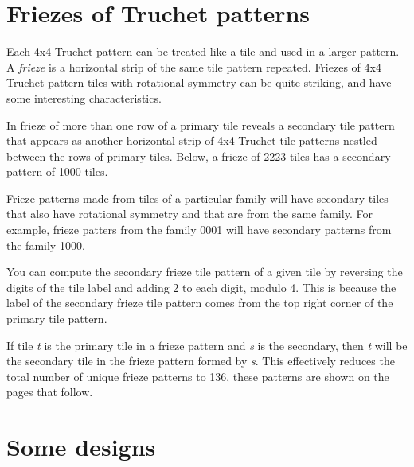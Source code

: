 \documentclass{tufte-book}
\begin{document}

%
% 
% 
\chapter{Friezes of Truchet patterns}

\noindent
Each 4x4 Truchet pattern can be treated like a tile and used in a larger pattern. A \textit{frieze} is a horizontal strip of the same tile pattern repeated. Friezes of 4x4 Truchet pattern tiles with rotational symmetry can be quite striking, and have some interesting characteristics. 

\vspace{0.5cm}
\noindent
In frieze of more than one row of a primary tile reveals a secondary tile pattern that appears as another horizontal strip of 4x4 Truchet tile patterns nestled between the rows of primary tiles. Below, a frieze of 2223 tiles has a secondary pattern of 1000 tiles.
\,

\vspace{0.5cm}


\vspace{0.5cm}
\noindent
Frieze patterns made from tiles of a particular family will have secondary tiles that also have rotational symmetry and that are from the same family. For example, frieze patters from the family 0001 will have secondary patterns from the family 1000. 
\marginnote{\centering} 

\vspace{0.5cm}
\noindent
You can compute the secondary frieze tile pattern of a given tile by reversing the digits of the tile label and adding 2 to each digit, modulo 4. This is because the label of the secondary frieze tile pattern comes from the top right corner of the primary tile pattern. 

\vspace{0.5cm}
\noindent
If tile \textit{t} is the primary tile in a frieze pattern and \textit{s} is the secondary, then \textit{t} will be the secondary tile in the frieze pattern formed by \textit{s}. This effectively reduces the total number of unique frieze patterns to 136, these patterns are shown on the pages that follow.
\newpage

%

\chapter{Some designs}



\backmatter
\nocite{*}


\end{document}
